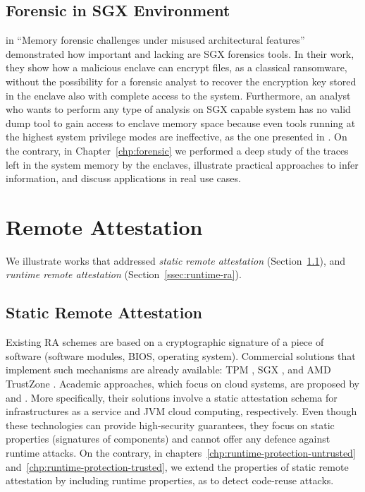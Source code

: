\subsection{Forensic in SGX Environment}
\label{ssec:forensic-in-sgx}
\cite{zhang2018memory} in ``Memory forensic challenges under
misused architectural features'' demonstrated how important and lacking are SGX
forensics tools. In their work, they show how a malicious enclave can encrypt
files, as a classical ransomware, without the possibility for a forensic analyst
to recover the encryption key stored in the enclave also with complete access to
the system.
Furthermore, an analyst who wants to perform any type of analysis on SGX
capable system has no valid dump tool to gain access to enclave
memory space because even tools running at the highest system privilege
modes are ineffective, as the one presented in \cite{reina2012hardware}.
On the contrary, in Chapter~\ref{chp:forensic} we performed a deep study of the 
traces left in the system memory by the enclaves, illustrate practical 
approaches to infer information, and discuss applications in real use cases.

\section{Remote Attestation}

\label{sec:remote-attestation}

We illustrate works that addressed \emph{static remote attestation} 
(Section~\ref{ssec:static-ra}), and \emph{runtime remote attestation} 
(Section~\ref{ssec:runtime-ra}).

\subsection{Static Remote Attestation}
\label{ssec:static-ra}

Existing RA schemes are based on a cryptographic signature of a piece of 
software (\eg software modules, BIOS, operating system). Commercial solutions 
that implement such mechanisms are already available: 
TPM \citep{tomlinson2017introduction}, SGX \citep{costan2016intel}, and AMD 
TrustZone \citep{winter2008trusted}. 
Academic approaches, which focus on cloud systems, are proposed by 
\cite{wang2018trusted} and \cite{ba2017jmonatt}. 
More specifically, their solutions involve a static attestation schema for 
infrastructures as a service and JVM cloud computing, respectively. 
Even though these technologies can provide high-security guarantees, they focus 
on static properties (\ie signatures of components) and cannot offer any 
defence against runtime attacks.
On the contrary, in chapters~\ref{chp:runtime-protection-untrusted} 
and~\ref{chp:runtime-protection-trusted}, we extend the properties of static 
remote attestation by including runtime properties, as to detect code-reuse 
attacks.

